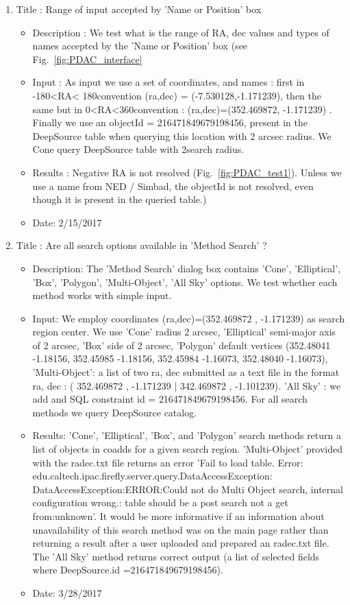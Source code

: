 \documentclass[DM,lsstdraft,toc]{lsstdoc}
\begin{document}
\begin{enumerate}
\item Title : Range of input accepted by 'Name or Position' box
   \begin{itemize}
       \item Description : We  test what is the range of RA, dec values and types of names accepted by the 'Name or Position' box (see Fig.~\ref{fig:PDAC_interface}
       \item Input : As input we use a set of coordinates, and names :  first in  -180\degree <RA< 180\degree convention (ra,dec) = (-7.530128\degree,-1.171239\degree), then the  same but in   0\degree<RA<360\degree convention : (ra,dec)=(352.469872\degree , -1.171239\degree) . Finally we use an objectId  = 216471849679198456, present in the DeepSource table when querying this  location with 2 arcsec radius. We Cone query DeepSource table with 2\arcsec search radius.
       \item Results : Negative RA is not resolved (Fig.~\ref{fig:PDAC_test1}). Unless we use a name from NED / Simbad, the objectId  is not resolved, even though it is present in the queried table.)
       \item Date: 2/15/2017
    \end{itemize}
 \item Title : Are all search options available in 'Method Search' ?
     \begin{itemize}
     	\item Description: The 'Method Search' dialog box contains 'Cone', 'Elliptical', 'Box', 'Polygon', 'Multi-Object', 'All Sky' options. We test whether each method works with simple input.
     	\item Input:  We employ coordinates (ra,dec)=(352.469872 , -1.171239) as search region center.  We use 'Cone' radius 2 arcsec, 'Elliptical' semi-major axis of 2 arcsec, 'Box' side of 2 arcsec, 'Polygon' default vertices (352.48041 -1.18156, 352.45985 -1.18156, 352.45984 -1.16073, 352.48040 -1.16073), 'Multi-Object': a list  of  two  ra, dec submitted as a text file in the format ra, dec : ( 352.469872 , -1.171239  | 342.469872 , -1.101239).  'All Sky' : we add and SQL constraint  id = 216471849679198456.  For all search methods we query DeepSource catalog.
     	\item Results: 'Cone', 'Elliptical', 'Box', and 'Polygon' search methods return a list of objects in coadds for a given search region.  'Multi-Object' provided with the radec.txt file  returns an error 'Fail to load table. Error: edu.caltech.ipac.firefly.server.query.DataAccessException: DataAccessException:ERROR:Could not do Multi Object search, internal configuration wrong.: table should be a post search not a get from:unknown'.  It would be more informative if an information about unavailability of this search method was on the main page rather than returning a result after a user uploaded and prepared an radec.txt file.   The 'All Sky' method returns correct output (a list of selected fields where DeepSource.id =216471849679198456).
      \item Date: 3/28/2017
     \end{itemize}
\end{enumerate}
\end{document}
